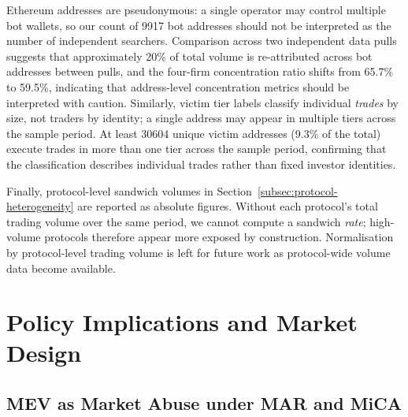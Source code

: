 \documentclass[pdflatex, sn-basic]{sn-jnl}
\theoremstyle{thmstylethree}%
\begin{document}
    Ethereum addresses are pseudonymous: a single operator may control multiple bot wallets, so our count of \num{9917} bot addresses should not be interpreted as the number of independent searchers.
    Comparison across two independent data pulls suggests that approximately \num{20}\% of total volume is re-attributed across bot addresses between pulls, and the four-firm concentration ratio shifts from \num{65.7}\% to \num{59.5}\%, indicating that address-level concentration metrics should be interpreted with caution.
    Similarly, victim tier labels classify individual \emph{trades} by size, not traders by identity; a single address may appear in multiple tiers across the sample period.
    At least \num{30604} unique victim addresses (\num{9.3}\% of the total) execute trades in more than one tier across the sample period, confirming that the classification describes individual trades rather than fixed investor identities.
    
    Finally, protocol-level sandwich volumes in Section~\ref{subsec:protocol-heterogeneity} are reported as absolute figures.
    Without each protocol's total trading volume over the same period, we cannot compute a sandwich \emph{rate}; high-volume protocols therefore appear more exposed by construction.
    Normalisation by protocol-level trading volume is left for future work as protocol-wide volume data become available.



	\section{Policy Implications and Market Design}
	\label{sec:policy-implications}

	\subsection{MEV as Market Abuse under MAR and MiCA}
	\label{subsec:regulatory-implications}
\end{document}
